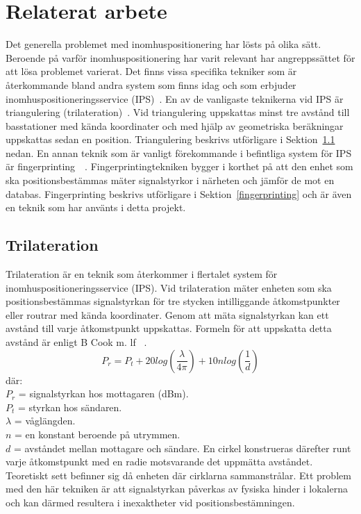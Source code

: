\documentclass[a4paper,12pt]{article}
\begin{document}
 \section{Relaterat arbete}
 Det generella problemet med inomhuspositionering har lösts på olika sätt.
 Beroende på varför inomhuspositionering har varit relevant har angreppssättet för att lösa problemet varierat. Det finns vissa specifika tekniker som är återkommande bland andra system som finns idag och som erbjuder inomhuspositioneringsservice (IPS)~\cite{IP1}.
 En av de vanligaste teknikerna vid IPS är triangulering (trilateration)~\cite{cook2005indoor}. Vid triangulering uppskattas minst tre avstånd till basstationer med kända koordinater och med hjälp av geometriska beräkningar uppskattas sedan en position. Triangulering beskrivs utförligare i Sektion~\ref{triangulering}
  nedan. En annan teknik som är vanligt förekommande i befintliga system för IPS är fingerprinting~\cite{IP1}~\cite{jun2018low}. Fingerprintingtekniken bygger i korthet på att den enhet som ska positionsbestämmas mäter signalstyrkor i närheten och jämför de mot en databas. Fingerprinting beskrivs utförligare i Sektion~\ref{fingerprinting} och är även en teknik som har använts i detta projekt.



 \subsection{Trilateration}\label{triangulering}
 Trilateration är en teknik som återkommer i flertalet system för inomhuspositioneringsservice (IPS). Vid trilateration mäter enheten som ska positionsbestämmas signalstyrkan för tre stycken intilliggande åtkomstpunkter eller routrar med kända koordinater. Genom att mäta signalstyrkan kan ett avstånd till varje åtkomstpunkt uppskattas. Formeln för att uppskatta detta avstånd är enligt B Cook m. lf ~\cite{cook2005indoor}.
 \newline
 $$ P_r = P_t + 20log(\frac{\lambda}{4\pi}) + 10nlog(\frac{1}{d})$$
 där:\\
 $  P_r $ = signalstyrkan hos mottagaren (dBm).\\
 $P_t$ = styrkan hos sändaren.\\
 $\lambda$ = våglängden.\\
 $ n $ = en konstant beroende på utrymmen.\\
 $ d $ = avståndet mellan mottagare och sändare.
 \bigskip
 \newline
 En cirkel konstrueras därefter runt varje åtkomstpunkt med en radie motsvarande det uppmätta avståndet. Teoretiskt sett befinner sig då enheten där cirklarna sammanstrålar. Ett problem med den här tekniken är att signalstyrkan påverkas av fysiska hinder i lokalerna och kan därmed resultera i inexaktheter vid positionsbestämningen.
\end{document}
